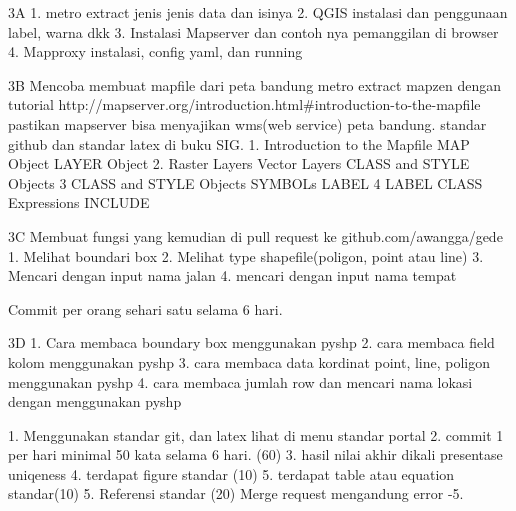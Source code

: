 3A
1. metro extract jenis jenis data dan isinya 
2. QGIS instalasi dan penggunaan label, warna dkk
3. Instalasi Mapserver dan contoh nya pemanggilan di browser
4. Mapproxy instalasi, config yaml, dan running

3B
Mencoba membuat mapfile dari peta bandung metro extract mapzen dengan tutorial
http://mapserver.org/introduction.html#introduction-to-the-mapfile
pastikan mapserver bisa menyajikan wms(web service) peta bandung. standar github dan standar latex di buku SIG.
1.
Introduction to the Mapfile
MAP Object
LAYER Object
2.
Raster Layers
Vector Layers
CLASS and STYLE Objects
3
CLASS and STYLE Objects
SYMBOLs
LABEL
4
LABEL
CLASS Expressions
INCLUDE


3C
Membuat fungsi yang kemudian di pull request ke github.com/awangga/gede
1. Melihat boundari box
2. Melihat type shapefile(poligon, point atau line)
3. Mencari dengan input nama jalan
4. mencari dengan input nama tempat

Commit per orang sehari satu selama 6 hari.

3D
1. Cara membaca boundary box menggunakan pyshp
2. cara membaca field kolom menggunakan pyshp
3. cara membaca data kordinat point, line, poligon menggunakan pyshp
4. cara membaca jumlah row dan mencari nama lokasi dengan menggunakan pyshp



1. Menggunakan standar git, dan latex lihat di menu standar portal
2. commit 1 per hari minimal 50 kata selama 6 hari. (60)
3. hasil nilai akhir dikali presentase uniqeness
4. terdapat figure standar (10)
5. terdapat table atau equation standar(10)
5. Referensi standar (20)
Merge request mengandung error -5.